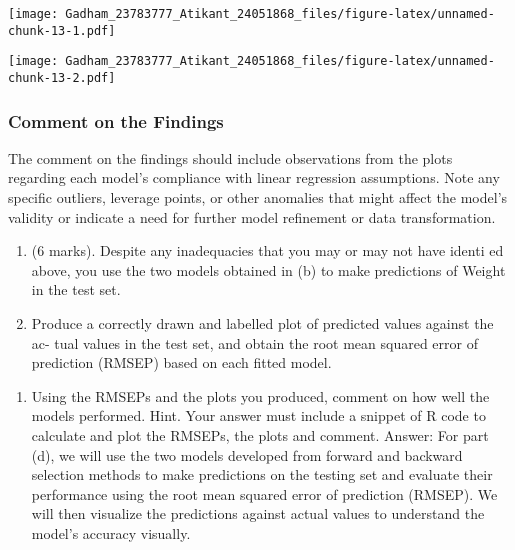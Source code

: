 \documentclass[
]{article}
\newenvironment{Shaded}{\begin{snugshade}}{\end{snugshade}}
\newcommand{\AttributeTok}[1]{\textcolor[rgb]{0.13,0.29,0.53}{#1}}
\newcommand{\CommentTok}[1]{\textcolor[rgb]{0.56,0.35,0.01}{\textit{#1}}}
\newcommand{\DecValTok}[1]{\textcolor[rgb]{0.00,0.00,0.81}{#1}}
\newcommand{\FunctionTok}[1]{\textcolor[rgb]{0.13,0.29,0.53}{\textbf{#1}}}
\newcommand{\NormalTok}[1]{#1}
\newcommand{\SpecialCharTok}[1]{\textcolor[rgb]{0.81,0.36,0.00}{\textbf{#1}}}
\newcommand{\StringTok}[1]{\textcolor[rgb]{0.31,0.60,0.02}{#1}}
\providecommand{\tightlist}{%
  \setlength{\itemsep}{0pt}\setlength{\parskip}{0pt}}
\begin{document}
\texttt{[image: Gadham\_23783777\_Atikant\_24051868\_files/figure-latex/unnamed-chunk-13-1.pdf]}

\begin{Shaded}
\end{Shaded}

\texttt{[image: Gadham\_23783777\_Atikant\_24051868\_files/figure-latex/unnamed-chunk-13-2.pdf]}

\hypertarget{comment-on-the-findings}{%
\subsubsection{Comment on the Findings}\label{comment-on-the-findings}}

The comment on the findings should include observations from the plots
regarding each model's compliance with linear regression assumptions.
Note any specific outliers, leverage points, or other anomalies that
might affect the model's validity or indicate a need for further model
refinement or data transformation.

\begin{enumerate}
\def\labelenumi{(\alph{enumi})}
\setcounter{enumi}{3}
\tightlist
\item
  (6 marks). Despite any inadequacies that you may or may not have
  identi ed above, you use the two models obtained in (b) to make
  predictions of Weight in the test set.
\item
  Produce a correctly drawn and labelled plot of predicted values
  against the ac- tual values in the test set, and obtain the root mean
  squared error of prediction (RMSEP) based on each fitted model.
\end{enumerate}

\begin{enumerate}
\def\labelenumi{(\roman{enumi})}
\setcounter{enumi}{1}
\tightlist
\item
  Using the RMSEPs and the plots you produced, comment on how well the
  models performed. Hint. Your answer must include a snippet of R code
  to calculate and plot the RMSEPs, the plots and comment. Answer: For
  part (d), we will use the two models developed from forward and
  backward selection methods to make predictions on the testing set and
  evaluate their performance using the root mean squared error of
  prediction (RMSEP). We will then visualize the predictions against
  actual values to understand the model's accuracy visually.
\end{enumerate}
\end{document}
